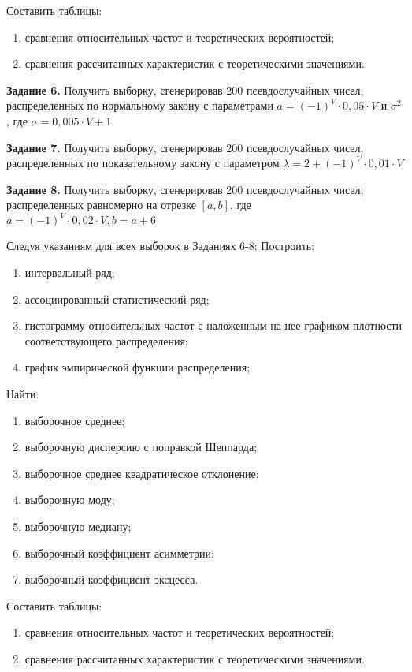 Составить таблицы:
\begin{enumerate}[label=\arabic*)]
	\item сравнения относительных частот и теоретических вероятностей;
	\item сравнения рассчитанных характеристик с теоретическими значениями. 
\end{enumerate}


\textbf{Задание 6.} Получить выборку, сгенерировав 200 псевдослучайных чисел, распределенных по
нормальному закону с параметрами $a=(-1)^V \cdot 0,05 \cdot V$ и $\sigma^2$, где $\sigma = 0,005 \cdot V + 1$.

\textbf{Задание 7.} Получить выборку, сгенерировав 200 псевдослучайных чисел, распределенных по
показательному закону с параметром $\lambda = 2 + (-1)^V \cdot 0,01 \cdot V$

\textbf{Задание 8.} Получить выборку, сгенерировав 200 псевдослучайных чисел, распределенных
равномерно на отрезке $[a, b]$, где $a = (-1)^V \cdot 0,02 \cdot V, b = a + 6$

Следуя указаниям для всех выборок в Заданиях 6-8:
Построить:
\begin{enumerate}[label=\arabic*)]
	\item интервальный ряд;
  \item ассоциированный статистический ряд; 
	\item гистограмму относительных частот с наложенным на нее графиком плотности соответствующего 
    распределения; 
	\item график эмпирической функции распределения;
\end{enumerate}

Найти:
\begin{enumerate}[label=\arabic*)]
	\item выборочное среднее;
	\item выборочную дисперсию с поправкой Шеппарда;
	\item выборочное среднее квадратическое отклонение;
	\item выборочную моду;
	\item выборочную медиану;
	\item выборочный коэффициент асимметрии;
	\item выборочный коэффициент эксцесса.
\end{enumerate}

Составить таблицы:
\begin{enumerate}[label=\arabic*)]
	\item сравнения относительных частот и теоретических вероятностей;
	\item сравнения рассчитанных характеристик с теоретическими значениями. 
\end{enumerate}
